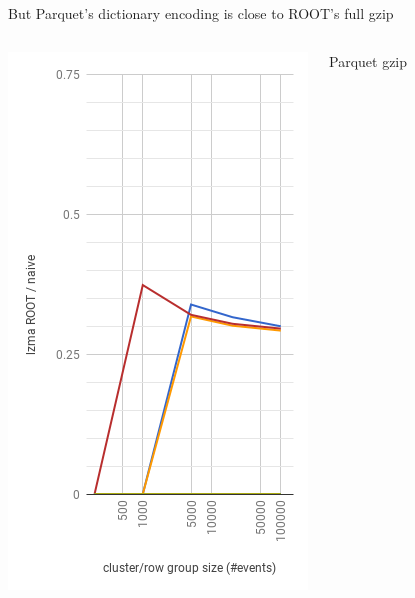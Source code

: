 \documentclass[aspectratio=169]{beamer}
\begin{document}
\begin{frame}{But Parquet's dictionary encoding is close to ROOT's full gzip}
\begin{columns}
\begin{center}
\includegraphics[width=\linewidth]{root-lzma.png}
\end{center}
\begin{center}
\mbox{\hspace{3 cm}}
Parquet gzip


\end{center}
\end{columns}
\end{frame}
\end{document}
